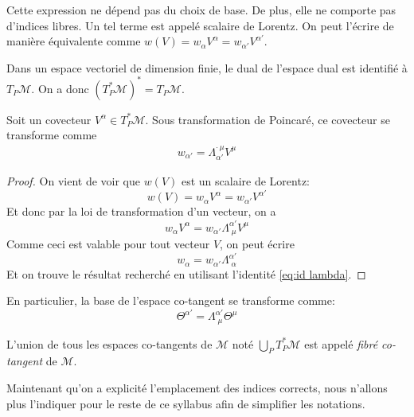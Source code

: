 Cette expression ne dépend pas du choix de base. De plus, elle ne comporte pas d'indices libres. Un tel terme est appelé scalaire de Lorentz. On peut l'écrire de manière équivalente comme $w(V) = w_{\alpha} V^{\alpha} = w_{\alpha '} V^{\alpha '} $.
\begin{rmk}
    Dans un espace vectoriel de dimension finie, le dual de l'espace dual est identifié à $T_P\mathcal{M}$. On a donc $(T^*_P\mathcal{M})^* = T_P\mathcal{M}$.
\end{rmk} 
\begin{theoremframe}
    \begin{propri}
        Soit un covecteur $V^\alpha\in T^*_P\mathcal{M}$. Sous transformation de Poincaré, ce covecteur se transforme comme
    \begin{align}
        w_{\alpha'} = \Lambda^{\cdot \, \mu}_{\alpha'} V^\mu
    \end{align}
    \end{propri}
\end{theoremframe}
\begin{proof}
    On vient de voir que $w(V)$ est un scalaire de Lorentz:
    \begin{equation}
        w(V) = w_{\alpha} V^{\alpha} = w_{\alpha '} V^{\alpha '} 
    \end{equation}
    Et donc par la loi de transformation d'un vecteur, on a
    \begin{equation}
        w_{\alpha} V^{\alpha} = w_{\alpha '} \Lambda^{\alpha '}_{\;\mu} V^\mu
    \end{equation}
    Comme ceci est valable pour tout vecteur $V$, on peut écrire
    \begin{equation}
        w_{\alpha}  = w_{\alpha '} \Lambda^{\alpha '}_{\;\alpha}
    \end{equation}
    Et on trouve le résultat recherché en utilisant l'identité \ref{eq:id lambda}.
\end{proof}

En particulier, la base de l'espace co-tangent se transforme comme:
$$ \Theta^{\alpha '} = \Lambda^{\alpha '}_{\; \mu} \Theta^{\mu}$$

\begin{theoremframe}
    \begin{defi}
        L'union de tous les espaces co-tangents de $\mathcal{M}$ noté $\bigcup_P T^*_P\mathcal{M}$ est appelé \textit{fibré co-tangent} de $\mathcal{M}$.
    \end{defi}
\end{theoremframe}
Maintenant qu'on a explicité l'emplacement des indices corrects, nous n'allons plus l'indiquer pour le reste de ce syllabus afin de simplifier les notations.

